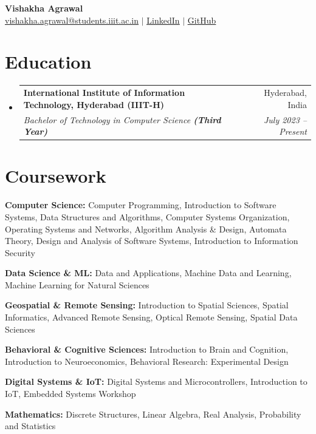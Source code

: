 \documentclass[letterpaper,11pt]{article}
\makeatletter
\newcommand{\resumeSubheading}[4]{
  \vspace{-2pt}\item
    \begin{tabular*}{0.97\textwidth}[t]{l@{\extracolsep{\fill}}r}
      \textbf{#1} & #2 \\
      \textit{\small#3} & \textit{\small #4} \\
    \end{tabular*}\vspace{-7pt}
}
\newcommand{\resumeSubHeadingListStart}{\begin{itemize}[leftmargin=0.15in, label={}]}
\newcommand{\resumeSubHeadingListEnd}{\end{itemize}}
\makeatother
\begin{document}
\begin{center}
    \textbf{\Huge Vishakha Agrawal} \\ \vspace{1pt}
    \small \href{mailto:vishakha.agrawal@students.iiit.ac.in}{\underline{vishakha.agrawal@students.iiit.ac.in}} $|$ 
    \href{https://www.linkedin.com/in/vishakha-agrawal-81b75b378}{\underline{LinkedIn}} $|$
    \href{https://github.com/vagrawal2718/projects}{\underline{GitHub}}
\end{center}

\section{Education}
  \resumeSubHeadingListStart
    \resumeSubheading
      {International Institute of Information Technology, Hyderabad (IIIT-H)}{Hyderabad, India}
      {Bachelor of Technology in Computer Science \textbf{(Third Year)}}{July 2023 -- Present}
  \resumeSubHeadingListEnd


\section{Coursework}
{
  \small
  \setlength{\leftskip}{0.15in}
  \textbf{Computer Science:} Computer Programming, Introduction to Software Systems, Data Structures and Algorithms, Computer Systems Organization, Operating Systems and Networks, Algorithm Analysis \& Design, Automata Theory, Design and Analysis of Software Systems, Introduction to Information Security\par
  \textbf{Data Science \& ML:} Data and Applications, Machine Data and Learning, Machine Learning for Natural Sciences\par
  \textbf{Geospatial \& Remote Sensing:} Introduction to Spatial Sciences, Spatial Informatics, Advanced Remote Sensing, Optical Remote Sensing, Spatial Data Sciences\par
  \textbf{Behavioral \& Cognitive Sciences:} Introduction to Brain and Cognition, Introduction to Neuroeconomics, Behavioral Research: Experimental Design\par
  \textbf{Digital Systems \& IoT:} Digital Systems and Microcontrollers, Introduction to IoT, Embedded Systems Workshop\par
  \textbf{Mathematics:} Discrete Structures, Linear Algebra, Real Analysis, Probability and Statistics\par
}
\end{document}
